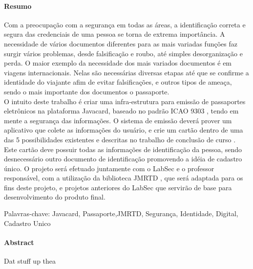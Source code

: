 \documentclass[12pt]{article}
\begin{document}
	\paragraph{\large Resumo}
		\begin{flushleft}

			\hspace{2cm} Com a preocupação com a segurança em todas as áreas, a identificação correta e segura das credenciais de uma pessoa se torna de extrema importância. A necessidade de vários documentos diferentes para as mais variadas funções faz surgir vários problemas, desde falsificação e roubo, até simples desorganização e perda.
O maior exemplo da necessidade dos mais variados documentos é em viagens internacionais. Nelas são necessárias diversas etapas até que se confirme a identidade do viajante afim de evitar falsificações, e outros tipos de ameaça, sendo o mais importante dos documentos o passaporte.\\
O intuito deste trabalho é criar uma infra-estrutura para emissão de passaportes eletrônicos na plataforma Javacard, baseado no padrão ICAO 9303 \cite{ICAO}, tendo em mente a segurança das informações. O sistema de emissão deverá prover um aplicativo que colete as informações do usuário, e crie um cartão dentro de uma das 5 possibilidades existentes e descritas no trabalho de conclusão de curso \cite{SASSO}.
Este cartão deve possuir todas as informações de identificação da pessoa, sendo desnecessário outro documento de identificação promovendo a idéia de cadastro único. 
O projeto será efetuado juntamente com o LabSec e o professor responsável, com a utilização da biblioteca JMRTD \cite{JMRTD}, que será adaptada para os fins deste projeto, e projetos anteriores do LabSec que servirão de base para desenvolvimento do produto final. 
	\vspace{1cm}

Palavras-chave: Javacard, Passaporte,JMRTD, Segurança, Identidade, Digital, Cadastro Unico

		\end{flushleft}


	\paragraph{\large Abstract}
		\begin{flushleft}

			Dat stuff up thea

		\end{flushleft}
	
\end{document}
